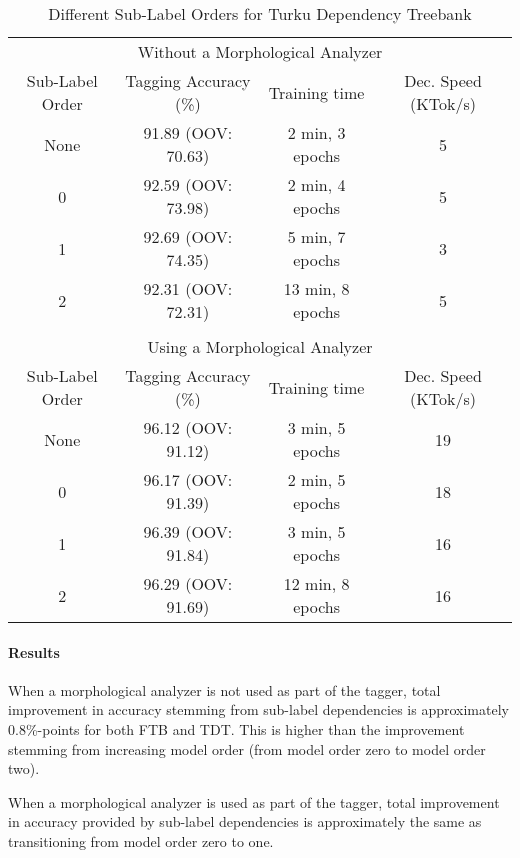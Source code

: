 \begin{table}[htb!]
\begin{center}
\begin{tabular}{cccc}
\multicolumn{4}{c}{Without a Morphological Analyzer}\\
Sub-Label Order & Tagging Accuracy (\%) & Training time    & Dec. Speed (KTok/s)\\
\hline
None            & 91.89 (OOV: 70.63)    & 2 min, 3 epochs  & 5                       \\
0               &  92.59 (OOV: 73.98)   & 2 min, 4 epochs  & 5                       \\
1               &  92.69 (OOV: 74.35)   & 5 min, 7 epochs  & 3                       \\
2               &  92.31 (OOV: 72.31)   & 13 min, 8 epochs  & 5                       \\
                &                       &                  &                          \\
\multicolumn{4}{c}{Using a Morphological Analyzer}\\
Sub-Label Order & Tagging Accuracy (\%) & Training time    & Dec. Speed (KTok/s)\\
\hline
None            &  96.12 (OOV: 91.12)   & 3 min, 5 epochs  & 19                       \\
0               &  96.17 (OOV: 91.39)   & 2 min, 5 epochs  & 18                       \\
1               &  96.39 (OOV: 91.84)   & 3 min, 5 epochs  & 16                       \\
2               &  96.29 (OOV: 91.69)   & 12 min, 8 epochs  & 16                       \\
\end{tabular}
\caption{Different Sub-Label Orders for Turku Dependency Treebank}\label{tab:tdt-sl-res}
\end{center}
\end{table}


\paragraph{Results} When a morphological analyzer is not used as part
of the tagger, total improvement in accuracy stemming from sub-label
dependencies is approximately 0.8\%-points for both FTB and TDT. This
is higher than the improvement stemming from increasing model order
(from model order zero to model order two).

When a morphological analyzer is used as part of the tagger, total
improvement in accuracy provided by sub-label dependencies is
approximately the same as transitioning from model order zero to one.

